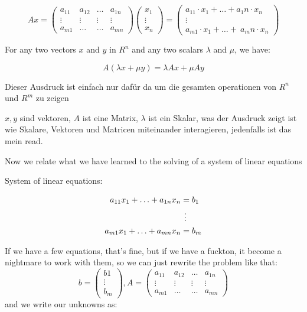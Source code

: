 \documentclass{article}
\begin{document}
$$
Ax=\begin{pmatrix} a_{11} & a_{12} & \ldots & a_{1n} \\ \vdots & \vdots & \vdots & \vdots \\ a_{m1} & \ldots & \ldots & a_{mn} \end{pmatrix} \begin{pmatrix} x_1 \\ \vdots \\ x_n \end{pmatrix} = \begin{pmatrix} a_{11} \cdot x_1 + \ldots + a_1n \cdot x_n \\ \vdots \\ a_{m1} \cdot x_1 + \ldots + \ a_mn \cdot x_n \end{pmatrix}
$$

For any two vectors $x$ and $y$ in $R^n$ and any two scalars $\lambda$ and $\mu$, we have:

$$
A(\lambda x+\mu y)=\lambda Ax+\mu Ay
$$

Dieser Ausdruck ist einfach nur dafür da um die gesamten operationen von $R^n$ und $R^m$ zu zeigen

$x,y$ sind vektoren, $A$ ist eine Matrix, $\lambda$ ist ein Skalar, was der Ausdruck zeigt ist wie Skalare,
Vektoren und Matricen miteinander interagieren, jedenfalls ist das mein read.

Now we relate what we have learned to the solving of a system of linear equations

System of linear equations:

$$
\begin{aligned}
    a_{11}x_{1} + \ldots + a_{1n}x_{n} & = b_{1} \\
    & \hspace{0.14cm} \vdots \\
    a_{m1}x_{1} + \ldots + a_{mn}x_{n} & = b_{m}
    \end{aligned}
$$

If we have a few equations, that's fine, but if we have a
fuckton, it become a nightmare to work with them,
so we can just rewrite the problem like that:
$$
b=\begin{pmatrix} b1 \\ \vdots \\ b_{m} \end{pmatrix}, A=\begin{pmatrix} a_{11} & a_{12} & \ldots & a_{1n} \\ \vdots & \vdots & \vdots & \vdots \\ a_{m1} & \ldots & \ldots & a_{mn} \end{pmatrix}
$$
and we write our unknowns as:
\end{document}

